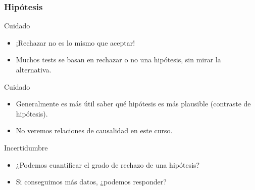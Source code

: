 \documentclass[table]{beamer}
\begin{document}
\begin{frame}
    \frametitle{Hipótesis}
    \begin{alertblock}{Cuidado}
        \begin{itemize}
            \item ¡Rechazar no es lo mismo que aceptar!
            \item Muchos tests se basan en rechazar o no una hipótesis, sin mirar la alternativa.
        \end{itemize}
    \end{alertblock}
    \begin{alertblock}{Cuidado}
        \begin{itemize}
            \item Generalmente es más útil saber qué hipótesis es más plausible (contraste de hipótesis).
            \item No veremos relaciones de causalidad en este curso.
        \end{itemize}
    \end{alertblock}
    \begin{block}{Incertidumbre}
        \begin{itemize}
            \item ¿Podemos cuantificar el grado de rechazo de una hipótesis?
            \item Si conseguimos más datos, ¿podemos responder?
        \end{itemize}
    \end{block}
\end{frame}
\end{document}
